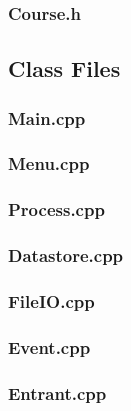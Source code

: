 \documentclass[a4paper, 12pt]{article}
\begin{document}
\clearpage
\subsubsection{Course.h}


\clearpage
\subsection{Class Files}

\subsubsection{Main.cpp}


\clearpage
\subsubsection{Menu.cpp}


\clearpage
\subsubsection{Process.cpp}


\clearpage
\subsubsection{Datastore.cpp}


\clearpage
\subsubsection{FileIO.cpp}


\clearpage
\subsubsection{Event.cpp}


\clearpage
\subsubsection{Entrant.cpp}

\end{document}
